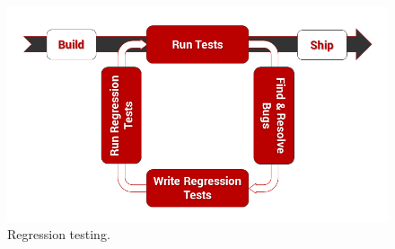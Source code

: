 \documentclass[a4paper,12pt]{book}
\begin{document}
{\begin{figure}[H]
  \centering
    \includegraphics[width=1.0\textwidth]{regression}
    \caption{Regression testing.~\cite{reg}}
\end{figure}

}
\end{document}
